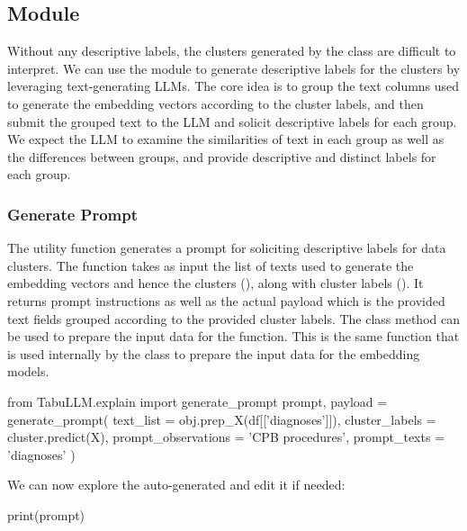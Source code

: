 \documentclass[article]{jss}
\begin{document}
\subsection[explain Module]{ Module}\label{subsec:using-explain}

Without any descriptive labels, the clusters generated by the  class are difficult to interpret. We can use the  module to generate descriptive labels for the clusters by leveraging text-generating LLMs. The core idea is to group the text columns used to generate the embedding vectors according to the cluster labels, and then submit the grouped text to the LLM and solicit descriptive labels for each group. We expect the LLM to examine the similarities of text in each group as well as the differences between groups, and provide descriptive and distinct labels for each group.

\subsubsection{Generate Prompt}\label{subsubsec:using-explain-prompt}

The utility function  generates a prompt for soliciting descriptive labels for data clusters. The function takes as input the list of texts used to generate the embedding vectors and hence the clusters (), along with cluster labels (). It returns prompt instructions as well as the actual payload which is the provided text fields grouped according to the provided cluster labels. The class method  can be used to prepare the input data for the  function. This is the same function that is used internally by the class  to prepare the input data for the embedding models.
\begin{pyblock}
from TabuLLM.explain import generate_prompt
prompt, payload = generate_prompt(
    text_list = obj.prep_X(df[['diagnoses']]),
    cluster_labels = cluster.predict(X),
    prompt_observations = 'CPB procedures',
    prompt_texts = 'diagnoses'
)
\end{pyblock}

We can now explore the auto-generated  and edit it if needed:
\begin{pyblock}
print(prompt)
\end{pyblock}
\stdoutpythontex %
\end{document}
